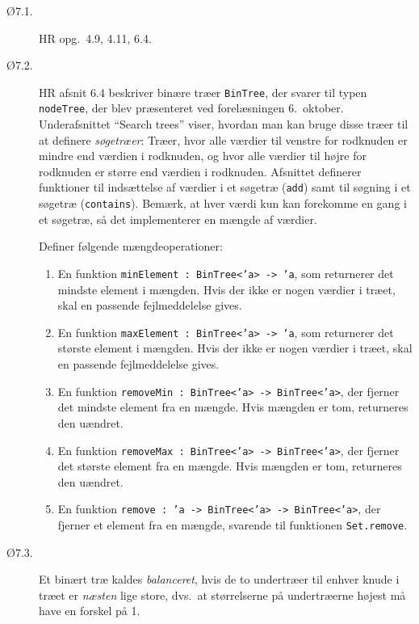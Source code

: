 \documentclass[a4paper]{article}
\begin{document}
\begin{description}
\item[Ø7.1.]  HR opg.\ 4.9, 4.11, 6.4.

\item[Ø7.2.] HR afsnit 6.4 beskriver binære træer \texttt{BinTree},
  der svarer til typen \texttt{nodeTree}, der blev præsenteret ved
  forelæsningen 6.\ oktober. Underafsnittet ``Search trees'' viser,
  hvordan man kan bruge disse træer til at definere \emph{søgetræer}:
  Træer, hvor alle værdier til venstre for rodknuden er mindre end
  værdien i rodknuden, og hvor alle værdier til højre for rodknuden er
  større end værdien i rodknuden.  Afsnittet definerer funktioner til
  indsættelse af værdier i et søgetræ (\texttt{add}) samt til søgning
  i et søgetræ (\texttt{contains}).  Bemærk, at hver værdi kun kan
  forekomme en gang i et søgetræ, så det implementerer en mængde af
  værdier.

  Definer følgende mængdeoperationer:

  \begin{enumerate}[i]
    \item En funktion \texttt{minElement : BinTree<'a> -> 'a}, som
      returnerer det mindste element i mængden.  Hvis der ikke er
      nogen værdier i træet, skal en passende fejlmeddelelse gives.
    \item En funktion \texttt{maxElement : BinTree<'a> -> 'a}, som
      returnerer det største element i mængden.  Hvis der ikke er
      nogen værdier i træet, skal en passende fejlmeddelelse gives.
    \item En funktion \texttt{removeMin : BinTree<'a> -> BinTree<'a>},
      der fjerner det mindste element fra en mængde.  Hvis mængden er
      tom, returneres den uændret.
    \item En funktion \texttt{removeMax : BinTree<'a> -> BinTree<'a>},
      der fjerner det største element fra en mængde.  Hvis mængden er
      tom, returneres den uændret.
    \item En funktion \texttt{remove : 'a -> BinTree<'a> ->
      BinTree<'a>}, der fjerner et element fra en mængde, svarende til
      funktionen \texttt{Set.remove}.
  \end{enumerate}

\item[Ø7.3.]  Et binært træ kaldes \emph{balanceret}, hvis de to
  undertræer til enhver knude i træet er \emph{næsten} lige store,
  dvs.\ at størrelserne på undertræerne højest må have en forskel på
  1.


\end{description}
\end{document}
